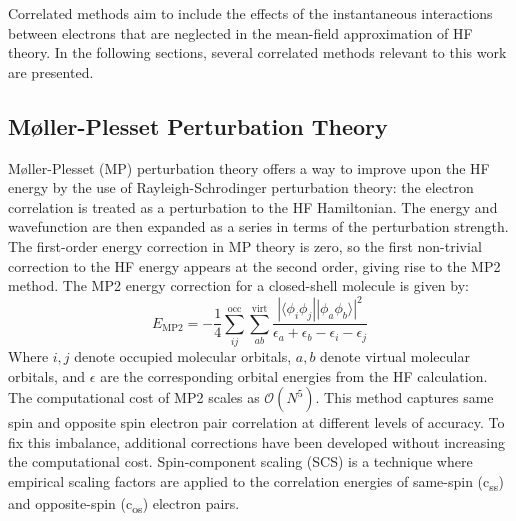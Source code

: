 Correlated methods aim to include the effects of the instantaneous interactions between electrons that are neglected in the mean-field approximation of HF theory. In the following sections, several correlated methods relevant to this work are presented.


\subsection{Møller-Plesset Perturbation Theory}
Møller-Plesset (MP)\cite{shavitt2009many} perturbation theory offers a way to improve upon the HF energy by the use of Rayleigh-Schrodinger perturbation theory: the electron correlation is treated as a perturbation to the HF Hamiltonian. The energy and wavefunction are then expanded as a series in terms of the perturbation strength. The first-order energy correction in MP theory is zero, so the first non-trivial correction to the HF energy appears at the second order, giving rise to the MP2 method. The MP2 energy correction for a closed-shell molecule is given by:
\begin{equation} \label{eq:MP2}
    E_{\mathrm{MP2}} = - \frac{1}{4} \sum_{ij}^{\mathrm{occ}} \sum_{ab}^{\mathrm{virt}} \frac{|\langle \phi_i \phi_j || \phi_a \phi_b \rangle|^2}{\epsilon_a + \epsilon_b - \epsilon_i - \epsilon_j}
\end{equation}
Where $i,j$ denote occupied molecular orbitals, $a,b$ denote virtual molecular orbitals, and $\epsilon$ are the corresponding orbital energies from the HF calculation. The computational cost of MP2 scales as $\mathcal{O}(N^5)$. This method captures same spin and opposite spin electron pair correlation at different levels of accuracy. To fix this imbalance, additional corrections have been developed without increasing the computational cost. Spin-component scaling (SCS)\cite{grimme2003improved} is a technique where empirical scaling factors are applied to the correlation energies of same-spin (c\textsubscript{ss}) and opposite-spin (c\textsubscript{os}) electron pairs.

